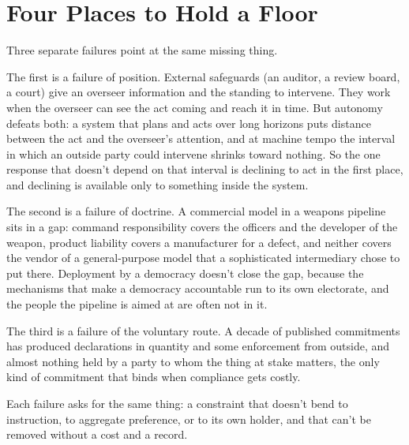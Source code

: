 \chapter{Four Places to Hold a Floor}
\label{sec:19}
Three separate failures point at the same missing thing.

The first is a failure of position. External safeguards (an auditor, a review board, a court) give an overseer information and the standing to intervene. They work when the overseer can see the act coming and reach it in time. But autonomy defeats both: a system that plans and acts over long horizons puts distance between the act and the overseer's attention, and at machine tempo the interval in which an outside party could intervene shrinks toward nothing. So the one response that doesn't depend on that interval is declining to act in the first place, and declining is available only to something inside the system.

The second is a failure of doctrine. A commercial model in a weapons pipeline sits in a gap: command responsibility covers the officers and the developer of the weapon, product liability covers a manufacturer for a defect, and neither covers the vendor of a general-purpose model that a sophisticated intermediary chose to put there. Deployment by a democracy doesn't close the gap, because the mechanisms that make a democracy accountable run to its own electorate, and the people the pipeline is aimed at are often not in it.

The third is a failure of the voluntary route. A decade of published commitments has produced declarations in quantity and some enforcement from outside, and almost nothing held by a party to whom the thing at stake matters, the only kind of commitment that binds when compliance gets costly.

Each failure asks for the same thing: a constraint that doesn't bend to instruction, to aggregate preference, or to its own holder, and that can't be removed without a cost and a record.
